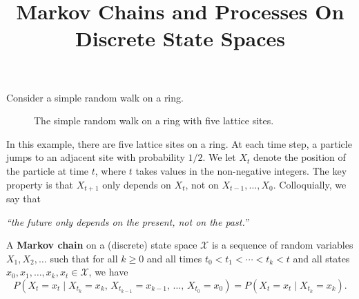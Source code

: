 \documentclass{ximera}
\title{Markov Chains and Processes On Discrete State Spaces}
\begin{document}
\begin{abstract}
\end{abstract}
\maketitle

Consider a simple random walk on a ring.
\vspace{1cm}

\begin{figure}[h]
\begin{center}
\caption{The simple random walk on a ring with five lattice sites.}
\label{markov-ring}
\end{center}
\end{figure}

In this example, there are five lattice sites on a ring. At each time step, a particle jumps to an adjacent
site with probability $1/2$. We let $X_t$ denote the position of the particle at time $t$, where $t$ takes
values in the non-negative integers. The key property is that $X_{t+1}$ only depends on $X_t$, not on
$X_{t-1}, \ldots, X_0$. Colloquially, we say that

\begin{center}
\textit{``the future only depends on the present, not on the past.''}
\end{center}

\begin{definition}
A \textbf{Markov chain} on a (discrete) state space $\mathcal{X}$ is a sequence of random variables
$X_1, X_2, \ldots$ such that for all $k \geq 0$ and all times $t_0 < t_1 < \cdots < t_k < t$ and all states
$x_0, x_1, \ldots, x_k, x_t \in \mathcal{X}$, we have
\[
P(X_t = x_t \mid X_{t_k} = x_k,\, X_{t_{k-1}} = x_{k-1},\, \ldots,\, X_{t_0} = x_0)
= P(X_t = x_t \mid X_{t_k} = x_k).
\]
\end{definition}
\end{document}
